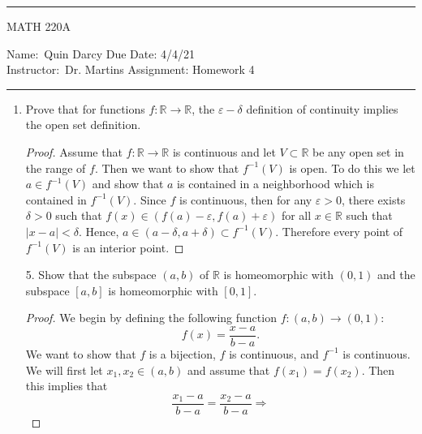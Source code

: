 \documentclass[12pt]{article}
\theoremstyle{definition}
\newcommand{\abs}[1]{\lvert #1 \rvert}
\begin{document}
 \thispagestyle{empty}\hrule

    \begin{center}
        \vspace{.4cm} { \large MATH 220A}
    \end{center}
    {Name:\ Quin Darcy \hspace{\fill} Due Date: 4/4/21 \\
    { Instructor:}\ Dr. Martins \hspace{\fill} Assignment:
    Homework 4 \\ \hrule}

    \begin{enumerate}
        \item Prove that for functions $f:\mathbb{R}\to\mathbb{R}$, the $\varepsilon-\delta$ definition 
        of continuity implies the open set definition.
            \begin{proof}
                Assume that $f:\mathbb{R}\to\mathbb{R}$ is continuous and let $V\subset\mathbb{R}$ 
                be any open set in the range of $f$. Then we want to show that $f^{-1}(V)$ is open.
                To do this we let $a\in f^{-1}(V)$ and show that $a$ is contained in a 
                neighborhood which is contained in $f^{-1}(V)$. Since $f$ is continuous, then 
                for any $\varepsilon>0$, there exists $\delta>0$ such that 
                $f(x)\in(f(a)-\varepsilon,f(a)+\varepsilon)$ for all $x\in\mathbb{R}$ such that 
                $\abs{x-a}<\delta$. Hence, $a\in(a-\delta, a+\delta)\subset f^{-1}(V)$. Therefore 
                every point of $f^{-1}(V)$ is an interior point.
            \end{proof}
        \item[5.] Show that the subspace $(a,b)$ of $\mathbb{R}$ is homeomorphic with $(0,1)$ and 
        the subspace $[a,b]$ is homeomorphic with $[0,1]$.
            \begin{proof}
                We begin by defining the following function $f:(a,b)\to(0,1)$:
                \begin{equation*}
                    f(x)=\frac{x-a}{b-a}.
                \end{equation*}
                We want to show that $f$ is a bijection, $f$ is continuous, and
                $f^{-1}$ is continuous. We will first let $x_1, x_2\in(a, b)$
                and assume that $f(x_1)=f(x_2)$. Then this implies that 
                \begin{equation*}
                    \frac{x_1-a}{b-a}=\frac{x_2-a}{b-a}\Rightarrow

\end{equation*}
\end{proof}
\end{enumerate}
\end{document}

